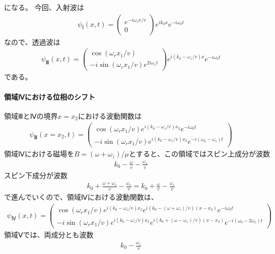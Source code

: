 になる。
今回、入射波は
\begin{align}
{\psi}_{Ⅰ}(x,t)=
\begin{pmatrix}
e^{-i\omega_{z}x/v} \\
0
\end{pmatrix}
e^{ik_{0}x}e^{-i\omega_{0}t}
\end{align}
なので、透過波は
\begin{align}
{\psi}_{Ⅲ}(x,t)=
\begin{pmatrix}
\cos({{\omega_{r}}x_{1}/v}) \\
-i\sin({{\omega_{r}}x_{1}/v})e^{2i\omega_{z}t}
\end{pmatrix}
e^{i(k_{0}-\omega_{z}/v)x}e^{-i\omega_{0}t}
\end{align}
である。
\paragraph{領域Ⅳにおける位相のシフト}
$領域ⅢとⅣの境界x=x_{2}における波動関数は$
\begin{align}
{\psi}_{Ⅲ}(x=x_{2},t)=
\begin{pmatrix}
\cos(\omega_{r}x_{1}/v)e^{i(k_{0}-\omega_{z}/v)x_{2}}e^{-i\omega_{0}t} \\
-i\sin(\omega_{r}x_{1}/v)e^{i(k_{0}-\omega_{z}/v)x_{2}}e^{-i(\omega_{0}-\omega_{s})t}
\end{pmatrix}
\end{align}
$領域Ⅳにおける磁場をB=(\omega+\omega_{z})/{\mu}とすると、この領域ではスピン上成分が波数$
\begin{align}
k_{0}-\frac{\omega}{v}-\frac{\omega_{z}}{v}
\end{align}
スピン下成分が波数
\begin{align}
k_{0}+\frac{\omega+\omega_{z}}{v}-\frac{\omega_{s}}{v}=k_{0}+\frac{\omega}{v}-\frac{\omega_{z}}{v}
\end{align}
で進んでいくので、領域Ⅳにおける波動関数は、
\begin{align}
{\psi}_{Ⅳ}(x,t)=
\begin{pmatrix}
\cos(\omega_{r}x_{1}/v)e^{i(k_{0}-\omega_{z}/v)x_{2}}e^{i(k_{0}-(\omega+\omega_{z})/v)(x-x_{2})}e^{-i\omega_{0}t} \\
-i\sin(\omega_{r}x_{1}/v)e^{i(k_{0}-\omega_{z}/v)x_{2}}e^{i(k_{0}+(\omega-\omega_{z})/v)(x-x_{2})}e^{-i(\omega_{0}-2\omega_{z})t}
\end{pmatrix}
\end{align}
領域Ⅴでは、両成分とも波数
\begin{align}
k_{0}-\frac{\omega_{z}}{v}
\end{align}

